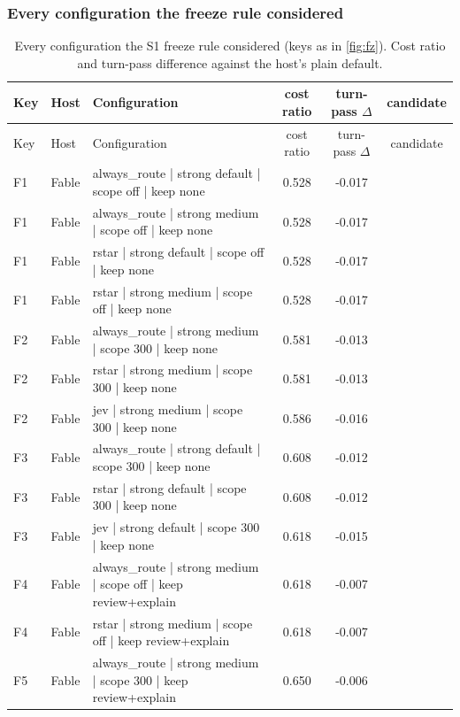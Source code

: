 \documentclass[11pt,letterpaper]{article}
\newcommand{\ok}{\textcolor{okgreen}{\ding{51}}}
\begin{document}
\subsubsection{Every configuration the freeze rule considered}


\begingroup\small
\FloatBarrier
\begin{xltabular}{\textwidth}{l l >{\raggedright\arraybackslash}X S[table-format=1.3] S[table-format=-1.3] c}
\caption{Every configuration the S1 freeze rule considered (keys as in \cref{fig:fz}). Cost ratio and turn-pass difference against the host's plain default.}\label{tab:fzkey}\\
\toprule Key & Host & Configuration & {cost ratio} & {turn-pass $\Delta$} & candidate \\ \midrule \endfirsthead
\toprule Key & Host & Configuration & {cost ratio} & {turn-pass $\Delta$} & candidate \\ \midrule \endhead
F1 & Fable & always\_route | strong default | scope off | keep none & 0.528 & -0.017 & \ok \\
F1 & Fable & always\_route | strong medium | scope off | keep none & 0.528 & -0.017 & \ok \\
F1 & Fable & rstar | strong default | scope off | keep none & 0.528 & -0.017 & \ok \\
F1 & Fable & rstar | strong medium | scope off | keep none & 0.528 & -0.017 & \ok \\
F2 & Fable & always\_route | strong medium | scope 300 | keep none & 0.581 & -0.013 & \ok \\
F2 & Fable & rstar | strong medium | scope 300 | keep none & 0.581 & -0.013 & \ok \\
F2 & Fable & jev | strong medium | scope 300 | keep none & 0.586 & -0.016 & \ok \\
F3 & Fable & always\_route | strong default | scope 300 | keep none & 0.608 & -0.012 & \ok \\
F3 & Fable & rstar | strong default | scope 300 | keep none & 0.608 & -0.012 & \ok \\
F3 & Fable & jev | strong default | scope 300 | keep none & 0.618 & -0.015 & \ok \\
F4 & Fable & always\_route | strong medium | scope off | keep review+explain & 0.618 & -0.007 & \ok \\
F4 & Fable & rstar | strong medium | scope off | keep review+explain & 0.618 & -0.007 & \ok \\
F5 & Fable & always\_route | strong medium | scope 300 | keep review+explain & 0.650 & -0.006 & \ok \\

\end{xltabular}
\end{document}
